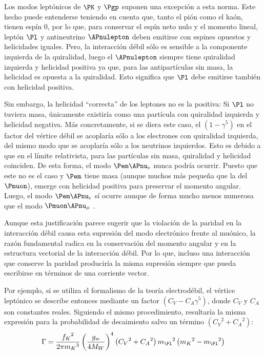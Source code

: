 Los modos leptónicos de $\PK$ y $\Pgp$ suponen una excepción a esta norma. Este hecho puede entenderse teniendo en cuenta que, tanto el pión como el kaón, tienen espín 0, por lo que, para conservar el espín neto nulo y el momento lineal, leptón $\Pl$ y antineutrino $\APnulepton$ deben emitirse con espines opuestos y helicidades iguales. Pero, la interacción débil sólo es sensible a la componente izquierda de la quiralidad, luego el $\APnulepton$ siempre tiene quiralidad izquierda y helicidad positiva ya que, para las antipartículas sin masa, la helicidad es opuesta a la quiralidad. Esto significa que $\Pl$ debe emitirse también con helicidad positiva.

Sin embargo, la helicidad ``correcta'' de los leptones no es la positiva: Si $\Pl$ no tuviera masa, únicamente existiría como una partícula con quiralidad izquierda y helicidad negativa. Más concretamente, si se diera este caso, el $\left( 1-\gamma^{5} \right)$ en el factor del vértice débil se acoplaría sólo a los electrones con quiralidad izquierda, del mismo modo que se acoplaría sólo a los neutrinos izquierdos. Esto es debido a que en el límite relativista, para las partículas sin masa, quiralidad y helicidad coinciden. De esta forma, el modo $\Pem \APnu_{e}$ nunca podría ocurrir. Puesto que este no es el caso y $\Pem$ tiene masa (aunque muchos más pequeña que la del $\Pmuon$), emerge con helicidad positiva para preservar el momento angular. Luego, el modo $\Pem \APnu_{e}$ sí ocurre aunque de forma mucho menos numerosa que el modo $\Pmuon \APnu_{\mu}$ \cite{Griffiths2008} \cite{Halzen}.

Aunque esta justificación parece sugerir que la violación de la paridad en la interacción débil causa esta supresión del modo electrónico frente al muónico, la razón fundamental radica en la conservación del momento angular y en la estructura vectorial de la interacción débil. Por lo que, incluso una interacción que conserve la paridad produciría la misma supresión siempre que pueda escribirse en términos de una corriente vector. 

Por ejemplo, si se utiliza el formalismo de la teoría electrodébil, el vértice leptónico se describe entonces mediante un factor $\left( C_{V}-C_{A}\gamma^{5} \right)$, donde $C_{V}$ y $C_{A}$ son constantes reales. Siguiendo el mismo procedimiento, resultaría la misma expresión para la probabilidad de decaimiento salvo un término $\left( {C_{V}}^2+{C_{A}}^2\right)$:
\begin{equation}
\Gamma =\dfrac{{f_{K}}^{2}}{2\pi {m_{K}}^{3}}\left( \dfrac{g_w}{4M_W}\right)^{4}\left( {C_{V}}^2+{C_{A}}^2\right){m_{\Pl}}^{2}\left({m_{K}}^{2}-{m_{\Pl}}^{2}\right)\label{eq:decayrateEWt}
\end{equation}


